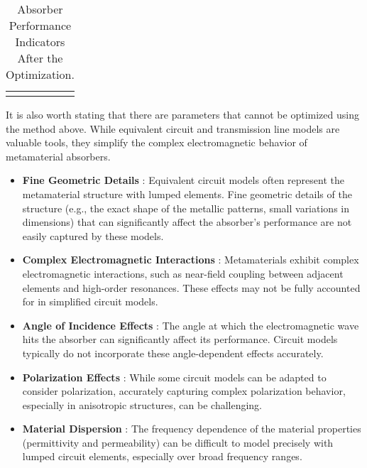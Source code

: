 \begin{landscape}
\begin{table}
\begin{tabular}{ccc}
\begin{tikzpicture}
\begin{axis}
                            \addlegendentry{$\Re{(e^{-j(\omega t + \beta\hat{z})})}$}
                            \addlegendentry{$\Im{(e^{-j(\omega t + \beta\hat{z})})}$}
                        \end{axis}
                    \end{tikzpicture}
    
                \end{tabular}
                \caption{Absorber Performance Indicators After the Optimization.}
                \label{table:Optimized}
            \end{table}
        \end{landscape}

        
        It is also worth stating that there are parameters that cannot be optimized using the
        method above. While equivalent circuit and transmission line models are valuable tools, 
        they simplify the complex electromagnetic behavior of metamaterial absorbers. 

        \begin{itemize}
            \item \textbf{Fine Geometric Details} : Equivalent circuit models often represent the 
                metamaterial structure with lumped elements. Fine geometric details of the 
                structure (e.g., the exact shape of the metallic patterns, small variations in
                dimensions) that can significantly affect the absorber's performance are not 
                easily captured by these models.
            \item \textbf{Complex Electromagnetic Interactions} : Metamaterials exhibit complex
                electromagnetic interactions, such as near-field coupling between adjacent 
                elements and high-order resonances. These effects may not be fully accounted for 
                in simplified circuit models.
            \item \textbf{Angle of Incidence Effects} : The angle at which the electromagnetic 
                wave hits the absorber can significantly affect its performance. Circuit models
                typically do not incorporate these angle-dependent effects accurately.
            \item \textbf{Polarization Effects} : While some circuit models can be adapted to 
                consider polarization, accurately capturing complex polarization behavior, 
                especially in anisotropic structures, can be challenging.
            \item \textbf{Material Dispersion} : The frequency dependence of the material 
                properties (permittivity and permeability) can be difficult to model precisely 
                with lumped circuit elements, especially over broad frequency ranges.
        \end{itemize}

